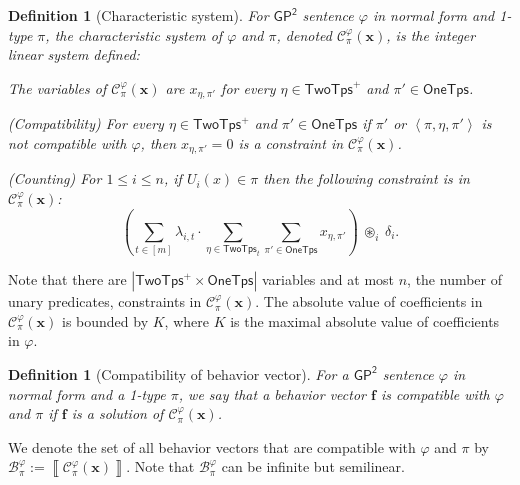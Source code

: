 \documentclass[10pt,a4paper]{article}
\newtheorem{definition}[theorem]{Definition}
\theoremstyle{definition}
\theoremstyle{remark}
\newcommand{\cB}{\mathcal{B}}
\newcommand{\cC}{\mathcal{C}}
\newcommand{\bff}{\mathbf{f}}
\newcommand{\bfx}{\mathbf{x}}
\newcommand{\twotypes}{\mathsf{TwoTps}}
\newcommand{\Onetypes}{\mathsf{OneTps}}
\newcommand{\GPtwo}   {\mathsf{GP^2}}
\newcommand{\tuple}[1]       {\left\langle #1 \right\rangle}
\newcommand{\intsinterval}[1]{{\left[ #1 \right]}}
\newcommand{\abs}[1]         {{\left| #1 \right|}}
\newcommand{\sol}[1] {\left\llbracket #1 \right\rrbracket}
\begin{document}
\begin{definition}[Characteristic system]
\label{def:characteristic-system}
    For $\GPtwo$ sentence $\varphi$ in normal form and 1-type $\pi$,
    the characteristic system of $\varphi$ and $\pi$, denoted $\cC^\varphi_\pi(\bfx)$,
    is the integer linear system defined:
    \begin{compactitem}
        \item The variables of $\cC^\varphi_\pi(\bfx)$ are $x_{\eta, \pi'}$
        for every $\eta \in \twotypes^+$ and $\pi' \in \Onetypes$.
        \item (Compatibility)
        For every $\eta \in \twotypes^+$ and $\pi' \in \Onetypes$
        if $\pi'$ or $\tuple{\pi, \eta, \pi'}$ is not compatible with $\varphi$,
        then $x_{\eta, \pi'} = 0$
        is a constraint in $\cC^\varphi_\pi(\bfx)$.
        \item (Counting)
        For $1 \le i \le n$, if $U_i(x) \in \pi$
        then the following constraint is in $\cC^\varphi_\pi(\bfx)$:
        \begin{equation*}
            \left(
                \sum_{t \in \intsinterval{m}}
                \lambda_{i, t} \cdot
                \sum_{\eta \in \twotypes_t}
                \sum_{\pi' \in \Onetypes} 
                x_{\eta, \pi'}
            \right)
            \ \circledast_i\ \delta_i.
        \end{equation*}
    \end{compactitem}

\end{definition}
Note that there are $\abs{\twotypes^+ \times \Onetypes}$ variables
and at most $n$, the number of unary predicates, constraints in $\cC^\varphi_\pi(\bfx)$.
The absolute value of coefficients in $\cC^\varphi_\pi(\bfx)$
is bounded by $K$, where $K$ is the maximal absolute value of coefficients in $\varphi$.

\begin{definition}[Compatibility of behavior vector]
    For a $\GPtwo$ sentence $\varphi$ in normal form 
    and a 1-type $\pi$,
    we say that a behavior vector $\bff$ is \emph{compatible} with $\varphi$ and $\pi$
    if $\bff$ is a solution of $\cC^\varphi_\pi(\bfx)$.
\end{definition}
We denote the set of all behavior vectors that are compatible with $\varphi$ and $\pi$
by $\cB^{\varphi}_{\pi} := \sol{\cC^\varphi_\pi(\bfx)}$.
Note that $\cB^{\varphi}_{\pi}$ can be infinite but semilinear.
\end{document}
